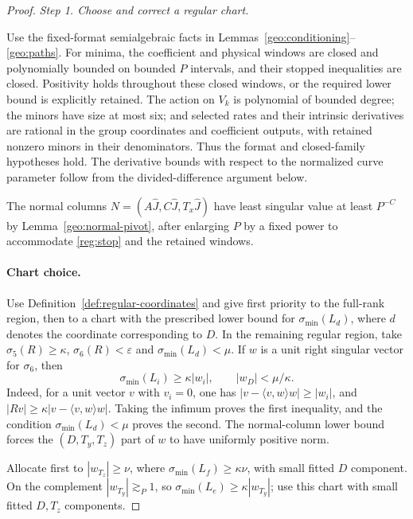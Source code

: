 \documentclass[11pt]{amsart}
\theoremstyle{definition}
\theoremstyle{remark}
\numberwithin{equation}{section}
\begin{document}
\begin{proof}
\par\medskip\noindent\textit{Step 1. Choose and correct a regular chart.}\par\nobreak\smallskip

Use the fixed-format semialgebraic facts in Lemmas~\ref{geo:conditioning}--\ref{geo:paths}. For minima, the coefficient and physical windows are closed and polynomially bounded on bounded $P$ intervals, and their stopped inequalities are closed. Positivity holds throughout these closed windows, or the required lower bound is explicitly retained. The action on $V_k$ is polynomial of bounded degree; the minors have size at most six; and selected rates and their intrinsic derivatives are rational in the group coordinates and coefficient outputs, with retained nonzero minors in their denominators. Thus the format and closed-family hypotheses hold. The derivative bounds with respect to the normalized curve parameter follow from the divided-difference argument below.

The normal columns $N=(A\widehat J,C\widehat J,T_x\widehat J)$ have least singular value at least $P^{-C}$ by Lemma~\ref{geo:normal-pivot}, after enlarging $P$ by a fixed power to accommodate \eqref{reg:stop} and the retained windows.

\paragraph{Chart choice.}

Use Definition~\ref{def:regular-coordinates} and give first priority to the full-rank region, then to a chart with the prescribed lower bound for $\sigma_{\min}(L_d)$, where $d$ denotes the coordinate corresponding to $D$. In the remaining regular region, take $\sigma_5(R)\ge\kappa$, $\sigma_6(R)<\varepsilon$ and $\sigma_{\min}(L_d)<\mu$. If $w$ is a unit right singular vector for $\sigma_6$, then
\[
\sigma_{\min}(L_i)\ge\kappa|w_i|,\qquad |w_D|<\mu/\kappa.
\]
Indeed, for a unit vector $v$ with $v_i=0$, one has $|v-\langle v,w\rangle w|\ge |w_i|$, and $|Rv|\ge\kappa|v-\langle v,w\rangle w|$. Taking the infimum proves the first inequality, and the condition $\sigma_{\min}(L_d)<\mu$ proves the second. The normal-column lower bound forces the $(D,T_y,T_z)$ part of $w$ to have uniformly positive norm.

Allocate first to $|w_{T_z}|\ge\nu$, where $\sigma_{\min}(L_f)\ge\kappa\nu$, with small fitted $D$ component. On the complement $|w_{T_y}|\gtrsim_P1$, so $\sigma_{\min}(L_e)\ge\kappa|w_{T_y}|$; use this chart with small fitted $D,T_z$ components.


\end{proof}
\end{document}
